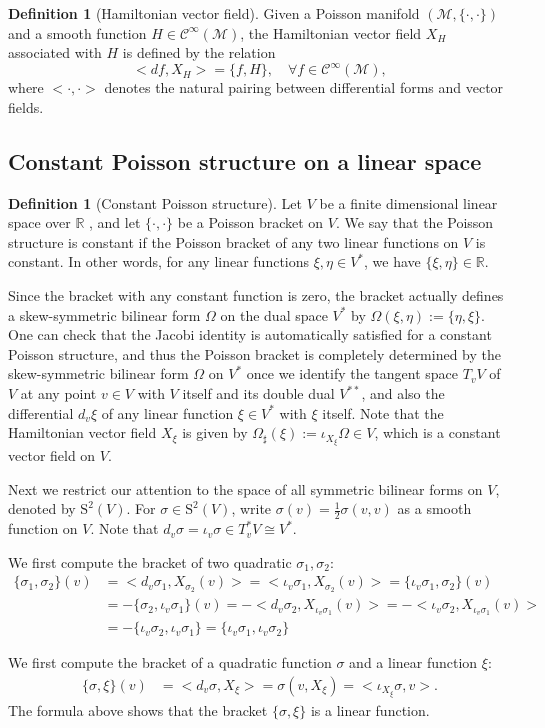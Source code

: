 \documentclass[11vt,a4vaver]{article}
\theoremstyle{definition}
\newtheorem{definition}[theorem]{Definition}
\begin{document}
\begin{definition}[Hamiltonian vector field]
    Given a Poisson manifold $(\mathcal{M}, \{\cdot,\cdot\})$ and a smooth function $H \in \mathcal{C} ^\infty(\mathcal{M} )$, 
    the Hamiltonian vector field $X_H$ associated with $H$ is defined by the relation
    \[
        <df, X_H> = \{f,H\}, \quad \forall f \in \mathcal{C} ^\infty(\mathcal{M} ),
    \]
    where $<\cdot,\cdot>$ denotes the natural pairing between differential forms and vector fields.
\end{definition}

\subsection{Constant Poisson structure on a linear space}

\begin{definition}[Constant Poisson structure]
    Let $V$ be a finite dimensional linear space over $\mathbb{R}$ , 
    and let $\{\cdot,\cdot\}$ be a Poisson bracket on $V$. 
    We say that the Poisson structure is constant if the 
    Poisson bracket of any two linear functions on $V$ is constant. 
    In other words, for any linear functions 
    $\xi,\eta\in V^*$, we have $\{\xi,\eta\} \in \mathbb{R}$.
\end{definition}

Since the bracket with any constant function is zero, 
the bracket actually defines a skew-symmetric bilinear form $\Omega$
on the dual space $V^*$ by $\Omega(\xi,\eta) := \{\eta,\xi\}$. 
One can check that the Jacobi identity is automatically satisfied for a constant Poisson structure,
and thus the Poisson         bracket is completely determined 
by the skew-symmetric bilinear form $\Omega$ on $V^*$ once we identify the tangent space $T_vV$
of $V$ at any point $v\in V$ with $V$ itself and its double dual $V^{**}$, and also
the differential $d_v\xi$ of any linear function $\xi\in V^*$ with $\xi$
itself. 
Note that 
the Hamiltonian vector field $X_\xi$  is given by
$\Omega_\sharp(\xi):=\iota_{X_\xi}\Omega\in V$, 
which is a constant vector field on $V$.

Next we restrict our attention to the space of all symmetric 
bilinear forms on $V$, denoted by $\text{S}^2(V)$. For $\sigma \in
\text{S}^2(V)$, write $\sigma(v)=\frac{1}{2}\sigma(v,v)$ as a smooth 
function on $V$. Note that $d_v\sigma= \iota_v \sigma\in T^*_vV 
\cong V^*$. 

We first compute the bracket of two quadratic $\sigma_1,\sigma_2$:
\begin{align*}
    \{\sigma_1,\sigma_2\}(v)&=<d_v{\sigma_1},X_{\sigma_2}(v)>=
    <\iota_v\sigma_1,X_{\sigma_2}(v)>=\{\iota_v\sigma_1,\sigma_2\}(v)\\
    &=-\{\sigma_2,\iota_v\sigma_1\}(v)=-<d_v\sigma_2,X_{\iota_v\sigma_1}(v)>=
    -<\iota_v\sigma_2,X_{\iota_v\sigma_1}(v)>\\
    &=-\{\iota_v\sigma_2,\iota_v\sigma_1\}=\{\iota_v\sigma_1,\iota_v\sigma_2\}
        \end{align*}
    

We first compute the bracket of a quadratic function $\sigma$ and a 
linear function $\xi$:
\begin{align}
    \{\sigma,\xi\}(v) &= <d_v\sigma, X_\xi>=\sigma(v,X_\xi)=<\iota_{X_\xi}\sigma, v> .
    \end{align} 
    The formula above shows that the bracket $\{\sigma,\xi\}$ 
    is a linear function.
\end{document}
